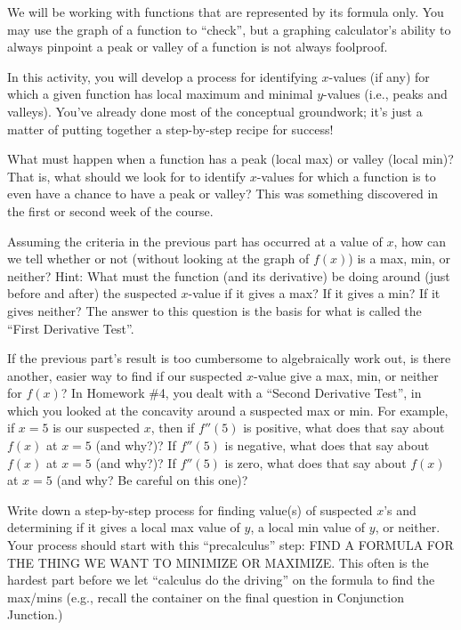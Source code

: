 \documentclass{ximera}
\begin{document}
We will be working with functions that are represented by its formula only.  You may use the graph of a function to ``check'', but a graphing calculator's ability to always pinpoint a peak or valley of a function is not always foolproof.

In this activity, you will develop a process for identifying $x$-values (if any) for which a given function has local maximum and minimal $y$-values (i.e., peaks and valleys).  You've already done most of the conceptual groundwork; it's just a matter of putting together a step-by-step recipe for success!

\begin{exploration} 
What must happen when a function  has a peak (local max) or valley (local min)?  That is, what should we look for to identify $x$-values for which a function is to even have a chance to have a peak or valley?  This was something discovered in the first or second week of the course.
\end{exploration}
\begin{exploration}
Assuming the criteria in the previous part has occurred at a value of $x$, how can we tell whether or not (without looking at the graph of  $f(x)$) is a max, min, or neither?  Hint:  What must the function (and its derivative) be doing around (just before and after) the suspected $x$-value if it gives a max?  If it gives a min?  If it gives neither?  The answer to this question is the basis for what is called the ``First Derivative Test''. 
\end{exploration}	
\begin{exploration} 
If the previous part's result is too cumbersome to algebraically work out, is there another, easier way to find if our suspected $x$-value give a max, min, or neither for $f(x)$?  In Homework \#4, you dealt with a ``Second Derivative Test'', in which you looked at the concavity around a suspected max or min.  For example, if $x = 5$ is our suspected $x$, then if $f''(5)$ is positive, what does that say about $f(x)$ at $x = 5$ (and why?)?  If $f''(5)$ is negative, what does that say about $f(x)$ at $x = 5$ (and why?)?  If $f''(5)$ is zero, what does that say about $f(x)$ at $x = 5$ (and why? Be careful on this one)?  
\end{exploration}
\begin{exploration} 
Write down a step-by-step process for finding value(s) of suspected $x$'s and determining if it gives a local max value of $y$, a local min value of $y$, or neither.  Your process should start with this ``precalculus'' step:  FIND A FORMULA FOR THE THING WE WANT TO MINIMIZE OR MAXIMIZE.  This often is the hardest part before we let ``calculus do the driving'' on the formula to find the max/mins (e.g., recall the container on the final question in Conjunction Junction.)
\end{exploration}
\end{document}
